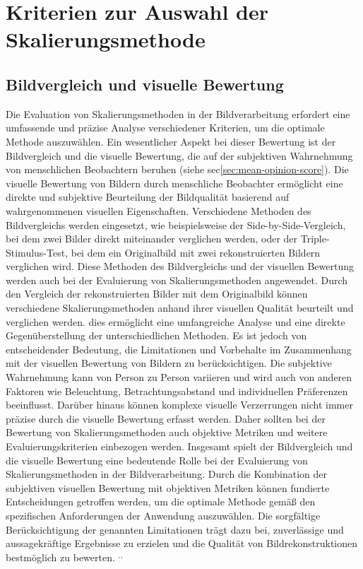 \section{Kriterien zur Auswahl der Skalierungsmethode} %

    \subsection{Bildvergleich und visuelle Bewertung}
        
        Die Evaluation von Skalierungsmethoden in der Bildverarbeitung erfordert eine umfassende und präzise Analyse verschiedener Kriterien, um die optimale Methode auszuwählen. 
        Ein wesentlicher Aspekt bei dieser Bewertung ist der Bildvergleich und die visuelle Bewertung, die auf der subjektiven Wahrnehmung von menschlichen Beobachtern beruhen (siehe sec\ref{sec:mean-opinion-score}).
        Die visuelle Bewertung von Bildern durch menschliche Beobachter ermöglicht eine direkte und subjektive Beurteilung der Bildqualität basierend auf wahrgenommenen visuellen Eigenschaften. 
        Verschiedene Methoden des Bildvergleichs werden eingesetzt, wie beispielsweise der Side-by-Side-Vergleich, bei dem zwei Bilder direkt miteinander verglichen werden, oder der Triple-Stimulus-Test, bei dem ein Originalbild mit zwei rekonstruierten Bildern verglichen wird.
        Diese Methoden des Bildvergleichs und der visuellen Bewertung werden auch bei der Evaluierung von Skalierungsmethoden angewendet. 
        Durch den Vergleich der rekonstruierten Bilder mit dem Originalbild können verschiedene Skalierungsmethoden anhand ihrer visuellen Qualität beurteilt und verglichen werden. 
        dies ermöglicht eine umfangreiche Analyse und eine direkte Gegenüberstellung der unterschiedlichen Methoden.
        Es ist jedoch von entscheidender Bedeutung, die Limitationen und Vorbehalte im Zusammenhang mit der visuellen Bewertung von Bildern zu berücksichtigen. 
        Die subjektive Wahrnehmung kann von Person zu Person variieren und wird auch von anderen Faktoren wie Beleuchtung, Betrachtungsabstand und individuellen Präferenzen beeinflusst. 
        Darüber hinaus können komplexe visuelle Verzerrungen nicht immer präzise durch die visuelle Bewertung erfasst werden. 
        Daher sollten bei der Bewertung von Skalierungsmethoden auch objektive Metriken und weitere Evaluierungskriterien einbezogen werden.
        Insgesamt spielt der Bildvergleich und die visuelle Bewertung eine bedeutende Rolle bei der Evaluierung von Skalierungsmethoden in der Bildverarbeitung.
        Durch die Kombination der subjektiven visuellen Bewertung mit objektiven Metriken können fundierte Entscheidungen getroffen werden, um die optimale Methode gemäß den spezifischen Anforderungen der Anwendung auszuwählen. 
        Die sorgfältige Berücksichtigung der genannten Limitationen trägt dazu bei, zuverlässige und aussagekräftige Ergebnisse zu erzielen und die Qualität von Bildrekonstruktionen bestmöglich zu bewerten.
        $^{,}$$^{,}$
    

